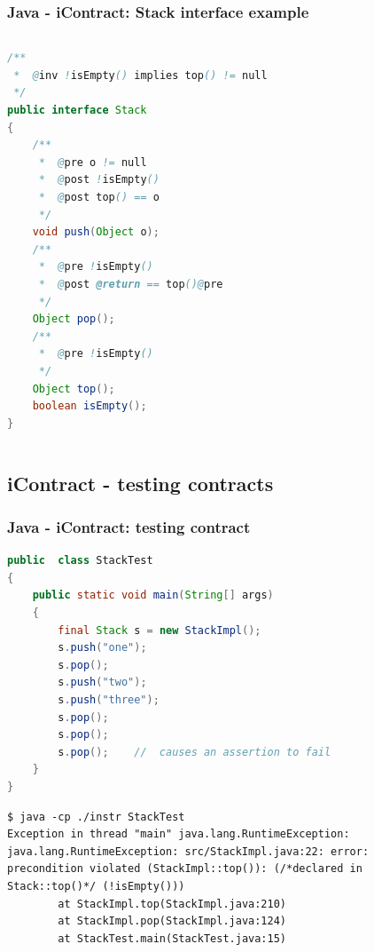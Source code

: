 \documentclass{beamer}
\begin{document}
\begin{frame}[fragile]
\frametitle{Java - iContract: Stack interface example}
\begin{columns}
\begin{lstlisting}[language=Java]
/**
 *  @inv !isEmpty() implies top() != null
 */
public interface Stack
{
    /**
     *  @pre o != null
     *  @post !isEmpty()
     *  @post top() == o
     */
    void push(Object o);
    /**
     *  @pre !isEmpty()
     *  @post @return == top()@pre
     */
    Object pop();
    /**
     *  @pre !isEmpty()
     */
    Object top();
    boolean isEmpty();
}
\end{lstlisting}
\end{columns}
\end{frame}

\subsection{iContract - testing contracts}
\begin{frame}[fragile]
\frametitle{Java - iContract: testing contract}
\begin{lstlisting}[language=Java]
public  class StackTest
{
    public static void main(String[] args)
    {
        final Stack s = new StackImpl();
        s.push("one");
        s.pop();
        s.push("two");
        s.push("three");
        s.pop();
        s.pop();
        s.pop();    //  causes an assertion to fail
    }
}
\end{lstlisting}
\begin{lstlisting}[basicstyle=\ttfamily\tiny]
$ java -cp ./instr StackTest
Exception in thread "main" java.lang.RuntimeException:
java.lang.RuntimeException: src/StackImpl.java:22: error:
precondition violated (StackImpl::top()): (/*declared in Stack::top()*/ (!isEmpty()))
        at StackImpl.top(StackImpl.java:210)
        at StackImpl.pop(StackImpl.java:124)
        at StackTest.main(StackTest.java:15)
\end{lstlisting}
\end{frame}
\end{document}
